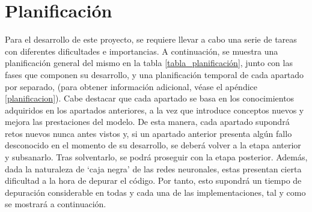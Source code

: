 \section{Planificación}

Para el desarrollo de este proyecto, se requiere llevar a cabo una serie de tareas con diferentes dificultades e importancias. A continuación, se muestra una planificación general del mismo en la tabla \ref{tabla_planificación}, junto con las fases que componen su desarrollo, y una planificación temporal de cada apartado por separado,  (para obtener información adicional, véase el apéndice \ref{planificacion}). Cabe destacar que cada apartado se basa en los conocimientos adquiridos en los apartados anteriores, a la vez que introduce conceptos nuevos y mejora las prestaciones del modelo. De esta manera, cada apartado supondrá retos nuevos nunca antes vistos y, si un apartado anterior presenta algún fallo desconocido en el momento de su desarrollo, se deberá volver a la etapa anterior y subsanarlo. Tras solventarlo, se podrá proseguir con la etapa posterior. Además, dada la naturaleza de `caja negra' de las redes neuronales, estas presentan cierta dificultad a la hora de depurar el código. Por tanto, esto supondrá un tiempo de depuración considerable en todas y cada una de las implementaciones, tal y como se mostrará a continuación.

